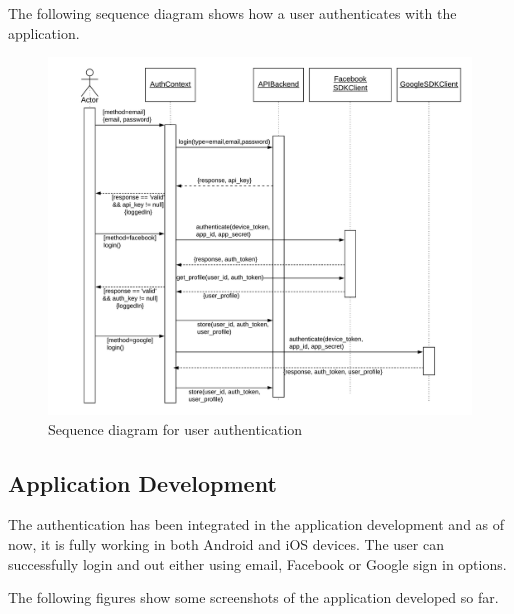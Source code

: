 \documentclass[12pt, a4paper, oneside]{article}
\begin{document}
The following sequence diagram shows how a user authenticates with the application.

\begin{figure}[H]
\includegraphics[width=\linewidth, keepaspectratio]{sequence-diagrams/auth.png}
\centering
\caption{Sequence diagram for user authentication}
\label{fig:auth-sequence}
\end{figure}

\subsection{Application Development}
The authentication has been integrated in the application development and as of now, it is fully working in both Android and iOS devices. The user can successfully login and out either using email, Facebook or Google sign in options.

The following figures show some screenshots of the application developed so far.
\end{document}
